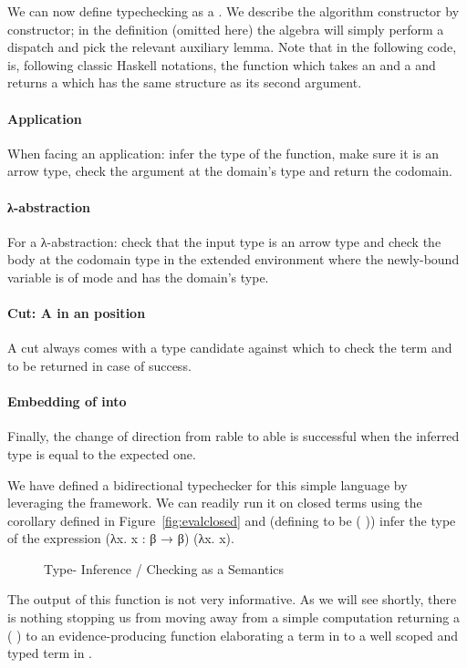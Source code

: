 We can now define typechecking as a \semrec{}. We describe the algorithm constructor
by constructor; in the  definition (omitted here) the algebra will
simply perform a dispatch and pick the relevant auxiliary lemma. Note that in the
following code, \AF{\_<\$\_} is, following classic Haskell notations, the function
which takes an  and a { } and returns a { }
which has the same structure as its second argument.

\paragraph{Application} When facing an application: infer the type of the function,
make sure it is an arrow type, check the argument at the domain's type and return
the codomain.
\paragraph{λ-abstraction} For a λ-abstraction: check that the input
type is an arrow type and check the body at the codomain type in the extended
environment where the newly-bound variable is of mode  and has the
domain's type.
\paragraph{Cut: A  in an  position} A cut always comes
with a type candidate against which to check the term and to be returned in
case of success.
\paragraph{Embedding of  into } Finally, the change of
direction from rable to able is successful when the
inferred type is equal to the expected one.

We have defined a bidirectional typechecker for this simple language by
leveraging the \semrec{} framework. We can readily run it on closed terms
using the  corollary defined in Figure~\ref{fig:evalclosed}
and (defining  to be {(  )}) infer the type of
the expression {(λx. x : β → β) (λx. x)}.

\begin{figure}[h!]
\begin{minipage}{0.35\textwidth}
\end{minipage}\hfill
\begin{minipage}{0.55\textwidth}
\end{minipage}
\caption{Type- Inference / Checking as a Semantics}
\end{figure}

The output of this function is not very informative. As we will see shortly,
there is nothing stopping us from moving away from a simple computation
returning a {( )} to an evidence-producing function
elaborating a term in  to a well scoped and typed term in .
